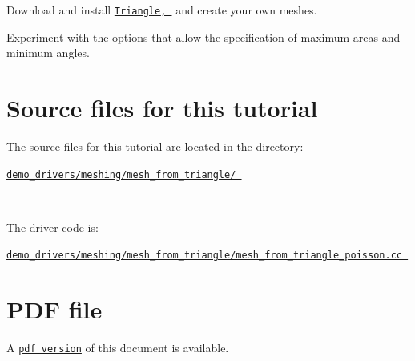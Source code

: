 \begin{DoxyEnumerate}
\item Download and install \href{http://www.cs.cmu.edu/~quake/triangle.html}{\tt {\ttfamily Triangle}, } and create your own meshes.
\item Experiment with the options that allow the specification of maximum areas and minimum angles.
\end{DoxyEnumerate}



 

\hypertarget{index_sources}{}\section{Source files for this tutorial}\label{index_sources}

\begin{DoxyItemize}
\item The source files for this tutorial are located in the directory\+:~\newline
~\newline
\begin{center} \href{../../../../demo_drivers/meshing/mesh_from_triangle/}{\tt demo\+\_\+drivers/meshing/mesh\+\_\+from\+\_\+triangle/ } \end{center} ~\newline

\item The driver code is\+: ~\newline
~\newline
\begin{center} \href{../../../../demo_drivers/meshing/mesh_from_triangle/mesh_from_triangle_poisson.cc}{\tt demo\+\_\+drivers/meshing/mesh\+\_\+from\+\_\+triangle/mesh\+\_\+from\+\_\+triangle\+\_\+poisson.\+cc } \end{center} 
\end{DoxyItemize}

 

 \hypertarget{index_pdf}{}\section{P\+D\+F file}\label{index_pdf}
A \href{../latex/refman.pdf}{\tt pdf version} of this document is available. 
